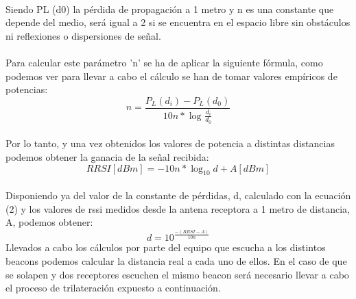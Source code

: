\documentclass[a4paper ,12pt, onecolumn]{article}
\begin{document}
                \paragraph{}
                Siendo PL (d0) la pérdida de propagación a 1 metro y n es una constante que depende del medio, será igual
                a 2 si se encuentra en el espacio libre sin obstáculos ni reflexiones o dispersiones de señal.
                \paragraph{}
                Para calcular este parámetro 'n' se ha de aplicar la siguiente fórmula, como podemos ver para llevar a cabo el 
                cálculo se han de tomar valores empíricos de potencias:
                \begin{equation}
                    n = \frac{ P_L(d_i) - P_L(d_0) }{10n*\log_{}\frac{d_i}{d_0}}
                \end{equation}
                \paragraph{}
                Por lo tanto, y una vez obtenidos los valores de potencia a distintas distancias podemos obtener la ganacia
                de la señal recibida:
                \begin{equation}
                    RRSI [dBm] = -10n*\log_{10} d+ A[dBm]
                \end{equation}
                \paragraph{}
                Disponiendo ya del valor de la constante de pérdidas, d, calculado con la ecuación (2) y los valores
                de rssi medidos desde la antena receptora a 1 metro de distancia, A, podemos obtener:
                \begin{equation}
                    d= 10^\frac{-(RRSI - A)}{10n}
                \end{equation}
                Llevados a cabo los cálculos por parte del equipo que escucha a los distintos beacons podemos calcular la distancia 
                real a cada uno de ellos. En el caso de que se solapen y dos receptores escuchen el mismo beacon será necesario
                llevar a cabo el proceso de trilateración expuesto a continuación.
\end{document}

